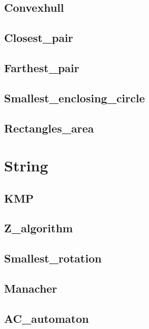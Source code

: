    \subsection{Convexhull}
        
    \subsection{Closest\_pair}
        
    \subsection{Farthest\_pair}
        
    \subsection{Smallest\_enclosing\_circle}
        
    \subsection{Rectangles\_area}
        

\section{String}
    \subsection{KMP}
        
    \subsection{Z\_algorithm}
        
    \subsection{Smallest\_rotation}
        
    \subsection{Manacher}
        
    \subsection{AC\_automaton}
        

